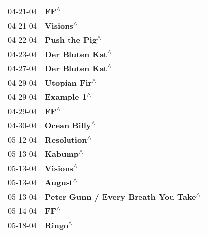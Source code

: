 \begin{supertabular}{p{0.25\columnwidth}p{0.75\columnwidth}}
 04-21-04 &                                                                       \textbf{FF\textsuperscript{$\wedge$}} \\
 04-21-04 &                                                                  \textbf{Visions\textsuperscript{$\wedge$}} \\
 04-22-04 &                                                             \textbf{Push the Pig\textsuperscript{$\wedge$}} \\
 04-23-04 &                                                           \textbf{Der Bluten Kat\textsuperscript{$\wedge$}} \\
 04-27-04 &                                                           \textbf{Der Bluten Kat\textsuperscript{$\wedge$}} \\
 04-29-04 &                                                              \textbf{Utopian Fir\textsuperscript{$\wedge$}} \\
 04-29-04 &                                                                \textbf{Example 1\textsuperscript{$\wedge$}} \\
 04-29-04 &                                                                       \textbf{FF\textsuperscript{$\wedge$}} \\
 04-30-04 &                                                              \textbf{Ocean Billy\textsuperscript{$\wedge$}} \\
 05-12-04 &                                                               \textbf{Resolution\textsuperscript{$\wedge$}} \\
 05-13-04 &                                                                   \textbf{Kabump\textsuperscript{$\wedge$}} \\
 05-13-04 &                                                                  \textbf{Visions\textsuperscript{$\wedge$}} \\
 05-13-04 &                                                                   \textbf{August\textsuperscript{$\wedge$}} \\
 05-13-04 &                                       \textbf{Peter Gunn / Every Breath You Take\textsuperscript{$\wedge$}} \\
 05-14-04 &                                                                       \textbf{FF\textsuperscript{$\wedge$}} \\
 05-18-04 &                                                                    \textbf{Ringo\textsuperscript{$\wedge$}} \\

\end{supertabular}
